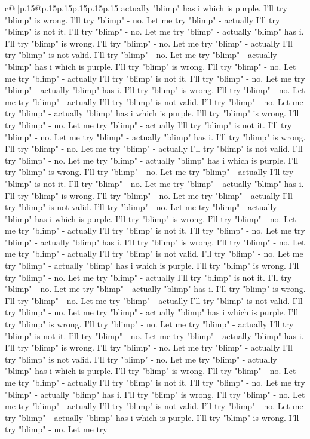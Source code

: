 \documentclass{article}
\begin{document}
{\begin{supertabular}{c@{$\;$}|p{.15\linewidth}@{}p{.15\linewidth}p{.15\linewidth}p{.15\linewidth}p{.15\linewidth}p{.15\linewidth}}
{{{actually "blimp" has i which is purple. I'll try "blimp" is wrong. I'll try "blimp" {-} no. Let me try "blimp" {-} actually I'll try "blimp" is not it. I'll try "blimp" {-} no. Let me try "blimp" {-} actually "blimp" has i. I'll try "blimp" is wrong. I'll try "blimp" {-} no. Let me try "blimp" {-} actually I'll try "blimp" is not valid. I'll try "blimp" {-} no. Let me try "blimp" {-} actually "blimp" has i which is purple. I'll try "blimp" is wrong. I'll try "blimp" {-} no. Let me try "blimp" {-} actually I'll try "blimp" is not it. I'll try "blimp" {-} no. Let me try "blimp" {-} actually "blimp" has i. I'll try "blimp" is wrong. I'll try "blimp" {-} no. Let me try "blimp" {-} actually I'll try "blimp" is not valid. I'll try "blimp" {-} no. Let me try "blimp" {-} actually "blimp" has i which is purple. I'll try "blimp" is wrong. I'll try "blimp" {-} no. Let me try "blimp" {-} actually I'll try "blimp" is not it. I'll try "blimp" {-} no. Let me try "blimp" {-} actually "blimp" has i. I'll try "blimp" is wrong. I'll try "blimp" {-} no. Let me try "blimp" {-} actually I'll try "blimp" is not valid. I'll try "blimp" {-} no. Let me try "blimp" {-} actually "blimp" has i which is purple. I'll try "blimp" is wrong. I'll try "blimp" {-} no. Let me try "blimp" {-} actually I'll try "blimp" is not it. I'll try "blimp" {-} no. Let me try "blimp" {-} actually "blimp" has i. I'll try "blimp" is wrong. I'll try "blimp" {-} no. Let me try "blimp" {-} actually I'll try "blimp" is not valid. I'll try "blimp" {-} no. Let me try "blimp" {-} actually "blimp" has i which is purple. I'll try "blimp" is wrong. I'll try "blimp" {-} no. Let me try "blimp" {-} actually I'll try "blimp" is not it. I'll try "blimp" {-} no. Let me try "blimp" {-} actually "blimp" has i. I'll try "blimp" is wrong. I'll try "blimp" {-} no. Let me try "blimp" {-} actually I'll try "blimp" is not valid. I'll try "blimp" {-} no. Let me try "blimp" {-} actually "blimp" has i which is purple. I'll try "blimp" is wrong. I'll try "blimp" {-} no. Let me try "blimp" {-} actually I'll try "blimp" is not it. I'll try "blimp" {-} no. Let me try "blimp" {-} actually "blimp" has i. I'll try "blimp" is wrong. I'll try "blimp" {-} no. Let me try "blimp" {-} actually I'll try "blimp" is not valid. I'll try "blimp" {-} no. Let me try "blimp" {-} actually "blimp" has i which is purple. I'll try "blimp" is wrong. I'll try "blimp" {-} no. Let me try "blimp" {-} actually I'll try "blimp" is not it. I'll try "blimp" {-} no. Let me try "blimp" {-} actually "blimp" has i. I'll try "blimp" is wrong. I'll try "blimp" {-} no. Let me try "blimp" {-} actually I'll try "blimp" is not valid. I'll try "blimp" {-} no. Let me try "blimp" {-} actually "blimp" has i which is purple. I'll try "blimp" is wrong. I'll try "blimp" {-} no. Let me try "blimp" {-} actually I'll try "blimp" is not it. I'll try "blimp" {-} no. Let me try "blimp" {-} actually "blimp" has i. I'll try "blimp" is wrong. I'll try "blimp" {-} no. Let me try "blimp" {-} actually I'll try "blimp" is not valid. I'll try "blimp" {-} no. Let me try "blimp" {-} actually "blimp" has i which is purple. I'll try "blimp" is wrong. I'll try "blimp" {-} no. Let me try }}}
\end{supertabular}}
\end{document}
